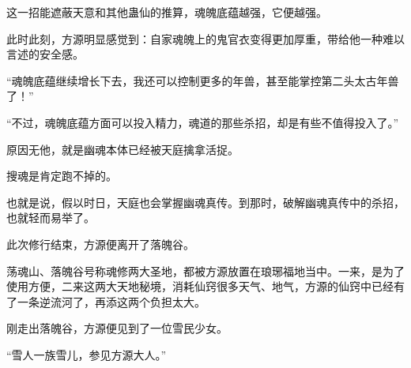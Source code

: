 \begin{this_body}
这一招能遮蔽天意和其他蛊仙的推算，魂魄底蕴越强，它便越强。

此时此刻，方源明显感觉到：自家魂魄上的鬼官衣变得更加厚重，带给他一种难以言述的安全感。

“魂魄底蕴继续增长下去，我还可以控制更多的年兽，甚至能掌控第二头太古年兽了！”

“不过，魂魄底蕴方面可以投入精力，魂道的那些杀招，却是有些不值得投入了。”

原因无他，就是幽魂本体已经被天庭擒拿活捉。

搜魂是肯定跑不掉的。

也就是说，假以时日，天庭也会掌握幽魂真传。到那时，破解幽魂真传中的杀招，也就轻而易举了。

此次修行结束，方源便离开了落魄谷。

荡魂山、落魄谷号称魂修两大圣地，都被方源放置在琅琊福地当中。一来，是为了使用方便，二来这两大天地秘境，消耗仙窍很多天气、地气，方源的仙窍中已经有了一条逆流河了，再添这两个负担太大。

刚走出落魄谷，方源便见到了一位雪民少女。

“雪人一族雪儿，参见方源大人。”

\end{this_body}

